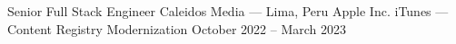 \cvEntryClient%
  {Senior Full Stack Engineer}%
  {Caleidos Media --- Lima, Peru}%
  {Apple Inc.}%
  {iTunes --- Content Registry Modernization}%
  {October 2022 -- March 2023}

